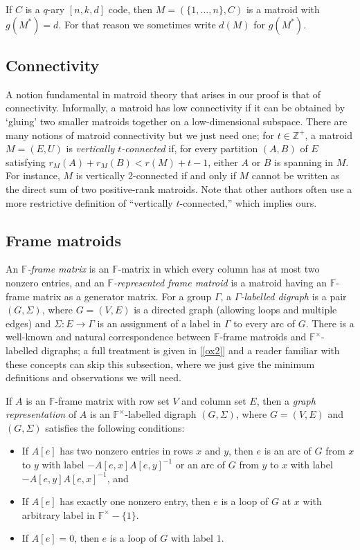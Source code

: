 \documentclass[12pt]{amsart}
\theoremstyle{definition}
\newcommand{\bF}{\mathbb F}
\newcommand{\bZ}{\mathbb Z}
\begin{document}
If $C$ is a $q$-ary $[n,k,d]$ code, then $M = (\{1,\ldots, n\}, C)$ is a matroid with $g(M^*) = d$. For that reason we sometimes write $d(M)$ for $g(M^*)$.
   
  \subsection*{Connectivity}
  A notion fundamental in matroid theory that arises in our proof is that of connectivity. Informally, a matroid has low connectivity if it can be obtained by `gluing' two smaller matroids together on a low-dimensional subspace. There are many notions of matroid connectivity but we just need one; for $t \in \bZ^+$, a matroid $M = (E,U)$ is \emph{vertically $t$-connected} if, for every partition $(A,B)$ of $E$ satisfying $r_M(A) + r_M(B) < r(M) + t - 1$, either $A$ or $B$ is spanning in $M$. For instance, $M$ is vertically 2-connected if and only if $M$ cannot be written as the direct sum of two positive-rank matroids. Note that other authors often use a more restrictive definition of ``vertically $t$-connected,'' which implies ours.
   
  \subsection*{Frame matroids}
   An \emph{$\bF$-frame matrix} is an $\bF$-matrix in which every column has at most two nonzero entries, and an \emph{$\bF$-represented frame matroid} is a matroid having an $\bF$-frame matrix as a generator matrix. For a group $\Gamma$, a \emph{$\Gamma$-labelled digraph} is a pair $(G,\Sigma)$, where $G = (V,E)$ is a directed graph (allowing loops and multiple edges) and $\Sigma: E \to \Gamma$ is an assignment of a label in $\Gamma$ to every arc of $G$. There is a well-known and natural correspondence between $\bF$-frame matroids and $\bF^{\times}$-labelled digraphs; a full treatment is given in [\ref{ox2}] and a reader familiar with these concepts can skip this subsection, where we just give the minimum definitions and observations we will need.  
   
   If $A$ is an $\bF$-frame matrix with row set $V$ and column set $E$, then a \emph{graph representation} of $A$ is an $\bF^{\times}$-labelled digraph $(G,\Sigma)$, where $G = (V,E)$ and $(G,\Sigma)$ satisfies the following conditions: 
  \begin{itemize}
    \item If $A[e]$ has two nonzero entries in rows $x$ and $y$, then $e$ is an arc of $G$ from $x$ to $y$ with label $-A[e,x]A[e,y]^{-1}$ or an arc of $G$ from $y$ to $x$ with label $-A[e,y]A[e,x]^{-1}$, and 
    \item If $A[e]$ has exactly one nonzero entry, then $e$ is a loop of $G$ at $x$ with arbitrary label in $\bF^\times - \{1\}$. 
    \item If $A[e] = 0$, then $e$ is a loop of $G$ with label $1$. 
   \end{itemize}
   
\end{document}
